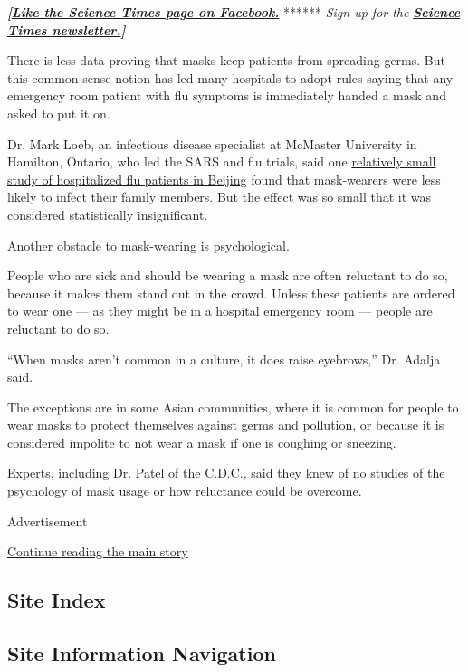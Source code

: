 \textbf{\emph{{[}}\href{http://on.fb.me/1paTQ1h}{\emph{Like the Science
Times page on Facebook.}}} ****** \emph{\textbar{} Sign up for the}
\textbf{\href{http://nyti.ms/1MbHaRU}{\emph{Science Times
newsletter.}}\emph{{]}}}

There is less data proving that masks keep patients from spreading
germs. But this common sense notion has led many hospitals to adopt
rules saying that any emergency room patient with flu symptoms is
immediately handed a mask and asked to put it on.

Dr. Mark Loeb, an infectious disease specialist at McMaster University
in Hamilton, Ontario, who led the SARS and flu trials, said one
\href{https://bmjopen.bmj.com/content/6/12/e012330.long}{relatively
small study of hospitalized flu patients in Beijing} found that
mask-wearers were less likely to infect their family members. But the
effect was so small that it was considered statistically insignificant.

Another obstacle to mask-wearing is psychological.

People who are sick and should be wearing a mask are often reluctant to
do so, because it makes them stand out in the crowd. Unless these
patients are ordered to wear one --- as they might be in a hospital
emergency room --- people are reluctant to do so.

``When masks aren't common in a culture, it does raise eyebrows,'' Dr.
Adalja said.

The exceptions are in some Asian communities, where it is common for
people to wear masks to protect themselves against germs and pollution,
or because it is considered impolite to not wear a mask if one is
coughing or sneezing.

Experts, including Dr. Patel of the C.D.C., said they knew of no studies
of the psychology of mask usage or how reluctance could be overcome.

Advertisement

\protect\hyperlink{after-bottom}{Continue reading the main story}

\hypertarget{site-index}{%
\subsection{Site Index}\label{site-index}}

\hypertarget{site-information-navigation}{%
\subsection{Site Information
Navigation}\label{site-information-navigation}}

